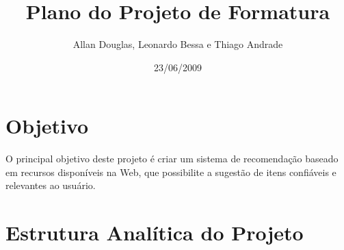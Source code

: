 \documentclass[]{article}
\title{Plano do Projeto de Formatura}
\author{Allan Douglas, Leonardo Bessa e Thiago Andrade  }
\date{23/06/2009}
\begin{document}
\ifpdf
{}
\else
{}
\fi

\maketitle


\section{Objetivo} %
\label{sec:objetivo}

 O principal objetivo deste projeto é criar um sistema de recomendação baseado em recursos disponíveis na Web, que possibilite a sugestão de itens confiáveis e relevantes ao usuário.


\section{Estrutura Analítica do Projeto} %
\label{sec:estrutura_analitica_do_projeto}
\end{document}
